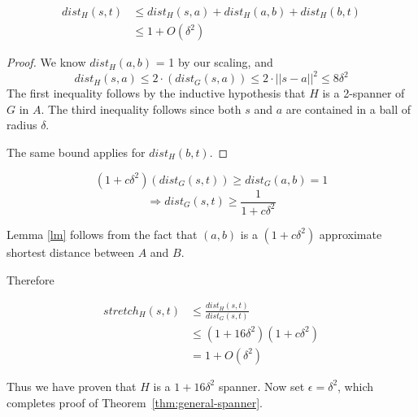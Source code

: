 \begin{lemma}
\begin{align*}
  dist_H(s,t)
    &\leq dist_H(s,a)+dist_H(a,b)+dist_H(b,t)\\
    & \leq 1+O(\delta^2)
\end{align*}
\end{lemma}
\begin{proof}
We know $dist_H(a,b)$ = 1 by our scaling, and $$dist_H(s,a) \leq 2 \cdot (dist_G(s,a)) \leq 2 \cdot ||s-a||^2 \leq 8\delta^2$$
The first inequality follows by the inductive hypothesis that $H$ is a 2-spanner of $G$ in $A$. The third inequality follows since both $s$ and $a$ are contained in a ball of radius $\delta$.

The same bound applies for $dist_H(b,t)$.
\end{proof}

\begin{lemma} \label{lm}
$$(1+c\delta^2)(dist_G(s,t)) \geq dist_G(a,b) = 1$$
$$ \Rightarrow dist_G(s,t)  \geq \frac{1}{1+c\delta^2}$$
\end{lemma}

Lemma \ref{lm} follows from the fact that $(a,b)$ is a $(1+c\delta^2)$ approximate shortest distance between $A$ and $B$.

Therefore

\begin{align*}
  stretch_H(s,t)
    &\leq \frac{dist_H(s,t)}{dist_G(s,t)} \\
    &\leq (1+16\delta^2)(1+c\delta^2) \\
    &= 1+O(\delta^2)
\end{align*}


Thus we have proven that $H$ is a $1+16\delta^2$ spanner. Now set
$\epsilon = \delta^2$, which completes
proof of Theorem~\ref{thm:general-spanner}.
